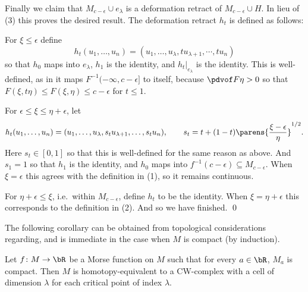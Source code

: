     Finally we claim that $M_{c-\epsilon}\cup e_\lambda$ is a deformation retract of $M_{c-\epsilon}\cup H$.
    In lieu of (3) this proves the desired result.
    The deformation retract $h_t$ is defined as follows:
    \benum
        \item For $\xi\leq\epsilon$ define
        $$ h_t(u_1,\dots,u_n) = (u_1,\dots,u_\lambda,tu_{\lambda+1},\cdots,tu_n) $$
        so that $h_0$ maps into $e_\lambda$, $h_1$ is the identity, and $h_t|_{e_\lambda}$ is the identity.
        This is well-defined, as in it maps $F^{-1}(-\infty,c-\epsilon]$ to itself, because
        $\pdvof F\eta>0$ so that $F(\xi,t\eta)\leq F(\xi,\eta)\leq c-\epsilon$ for $t\leq1$.
        \item For $\epsilon\leq\xi\leq\eta+\epsilon$, let
        $$ h_t(u_1,\dots,u_n) = (u_1,\dots,u_\lambda,s_tu_{\lambda+1},\dots,s_tu_n),\qquad
        s_t = t + (1-t)\parens{\frac{\xi-\epsilon}\eta}^{1/2} . $$
        Here $s_t\in[0,1]$ so that this is well-defined for the same reason as above.
        And $s_1=1$ so that $h_1$ is the identity, and $h_0$ maps into
        $f^{-1}(c-\epsilon)\subseteq M_{c-\epsilon}$.
        When $\xi=\epsilon$ this agrees with the definition in (1), so it remains continuous.
        \item For $\eta+\epsilon\leq\xi$, i.e.\ within $M_{c-\epsilon}$, define $h_t$ to be the identity.
        When $\xi=\eta+\epsilon$ this corresponds to the definition in (2).
    \eenum
    And so we have finished.
    \qed

\eproof

The following corollary can be obtained from topological considerations regarding, and is immediate in the
case when $M$ is compact (by induction).

\bcoro

    Let $f\colon M\to\bR$ be a Morse function on $M$ such that for every $a\in\bR$, $M_a$ is compact.
    Then $M$ is homotopy-equivalent to a CW-complex with a cell of dimension $\lambda$ for each critical
    point of index $\lambda$.

\ecoro

